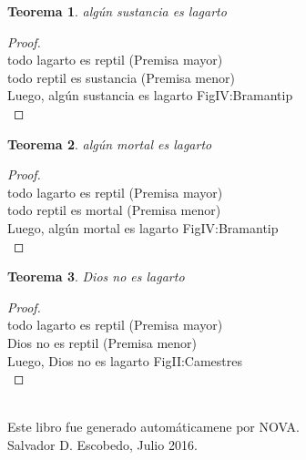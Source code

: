 ﻿\documentclass[12pt]{book}
\newtheorem{theorem}{Teorema}[chapter]
\newtheorem{proof}{Demostración}
\begin{document}
\begin{theorem}
algún sustancia es lagarto
\label{th: 111}
\end{theorem}\begin{proof}\\todo lagarto es reptil	 (Premisa mayor) \\todo reptil es sustancia	 (Premisa menor) \\Luego, algún sustancia es lagarto	FigIV:Bramantip \\ \end{proof}
\begin{theorem}
algún mortal es lagarto
\label{th: 112}
\end{theorem}\begin{proof}\\todo lagarto es reptil	 (Premisa mayor) \\todo reptil es mortal	 (Premisa menor) \\Luego, algún mortal es lagarto	FigIV:Bramantip \\ \end{proof}
\begin{theorem}
Dios no es lagarto
\label{th: 113}
\end{theorem}\begin{proof}\\todo lagarto es reptil	 (Premisa mayor) \\Dios no es reptil	 (Premisa menor) \\Luego, Dios no es lagarto	FigII:Camestres \\ \end{proof}
\\\small{Este libro fue generado automáticamene por NOVA.} \\
\small{Salvador D. Escobedo, Julio 2016}.
\end{document}
